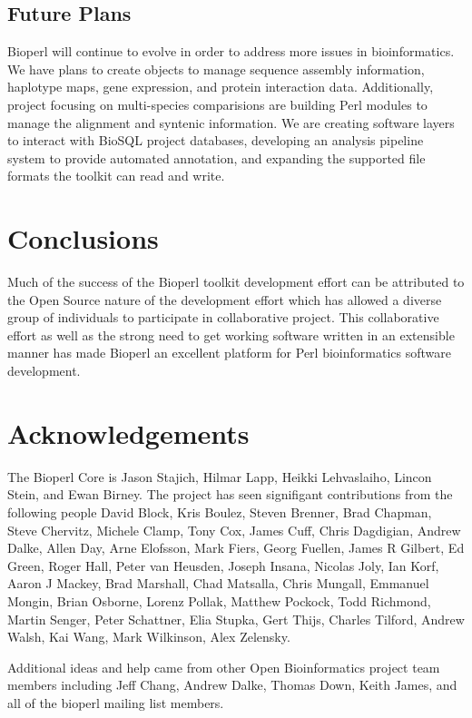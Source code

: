 \documentclass[12pt]{article}
\begin{document}
\subsection{Future Plans}

Bioperl will continue to evolve in order to address more issues in
bioinformatics.  We have plans to create objects to manage sequence
assembly information, haplotype maps, gene expression, and protein
interaction data.  Additionally, project focusing on multi-species
comparisions are building Perl modules to manage the alignment and
syntenic information.  We are creating software layers to interact
with BioSQL project\cite{biosql} databases, developing an analysis
pipeline system to provide automated annotation, and expanding the
supported file formats the toolkit can read and write.

\section{Conclusions}

Much of the success of the Bioperl toolkit development effort can be
attributed to the Open Source nature of the development effort which
has allowed a diverse group of individuals to participate in
collaborative project.  This collaborative effort as well as the
strong need to get working software written in an extensible manner
has made Bioperl an excellent platform for Perl bioinformatics
software development.

\section{Acknowledgements}

The Bioperl Core is Jason Stajich, Hilmar Lapp, Heikki Lehvaslaiho,
Lincon Stein, and Ewan Birney.  The project has seen signifigant
contributions from the following people David Block, Kris Boulez,
Steven Brenner, Brad Chapman, Steve Chervitz, Michele Clamp, Tony Cox,
James Cuff, Chris Dagdigian, Andrew Dalke, Allen Day, Arne Elofsson,
Mark Fiers, Georg Fuellen, James R Gilbert, Ed Green, Roger Hall,
Peter van Heusden, Joseph Insana, Nicolas Joly, Ian Korf, Aaron J
Mackey, Brad Marshall, Chad Matsalla, Chris Mungall, Emmanuel Mongin,
Brian Osborne, Lorenz Pollak, Matthew Pockock, Todd Richmond, Martin
Senger, Peter Schattner, Elia Stupka, Gert Thijs, Charles Tilford,
Andrew Walsh, Kai Wang, Mark Wilkinson, Alex Zelensky.

Additional ideas and help came from other Open Bioinformatics project
team members including Jeff Chang, Andrew Dalke, Thomas Down, Keith
James, and all of the bioperl mailing list members.
\end{document}
